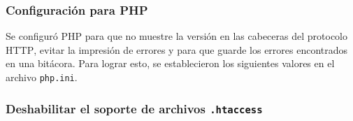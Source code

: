 {
 \begin{table}[H]
 \caption{Directivas de seguridad de Apache \textsc{HTTPD}}{}
 \label{tab:apache-hardening}
 \noindent{} %
 \end{table}
}

        \subsubsection{Configuraci\'{o}n para \textsc{PHP}}

Se configur\'{o} \textsc{PHP} para que no muestre la versi\'{o}n en las cabeceras del protocolo \textsc{HTTP}, evitar la impresi\'{o}n de errores y para que guarde los errores encontrados en una bit\'{a}cora. Para lograr esto, se establecieron los siguientes valores en el archivo \texttt{php.ini}.

{
 \begin{table}[H]
 \caption{Directivas de seguridad de \textsc{PHP}}{}
 \noindent{} %
 \end{table}
}

        \subsubsection{Deshabilitar el soporte de archivos \texttt{.htaccess}}

